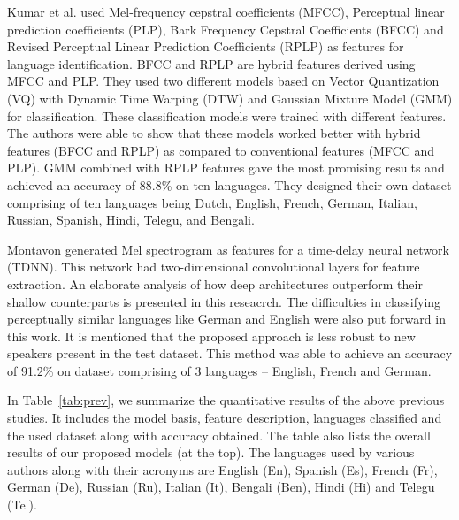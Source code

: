 \documentclass[runningheads]{llncs}
\begin{document}
Kumar et al. \cite{kumar2010spoken} used Mel-frequency cepstral coefficients (MFCC), Perceptual linear prediction coefficients (PLP), Bark Frequency Cepstral Coefficients (BFCC) and Revised Perceptual Linear Prediction Coefficients (RPLP) as features for language identification. BFCC and RPLP are hybrid features derived using MFCC and PLP. They used two different models based on Vector Quantization (VQ) with Dynamic Time Warping (DTW) and Gaussian Mixture Model (GMM) for classification. These classification models were trained with different features. The authors were able to show that these models worked better with hybrid features (BFCC and RPLP) as compared to conventional features (MFCC and PLP). GMM combined with RPLP features gave the most promising results and achieved an accuracy of 88.8\% on ten languages. They designed their own dataset comprising of ten languages being Dutch, English, French, German, Italian, Russian, Spanish, Hindi, Telegu, and Bengali. 

Montavon \cite{montavon2009deep} generated Mel spectrogram as features for a time-delay neural network (TDNN). This network had two-dimensional convolutional layers for feature extraction. An elaborate analysis of how deep architectures outperform their shallow counterparts is presented in this reseacrch. The difficulties in classifying perceptually similar languages like German and English were also put forward in this work. It is mentioned that the proposed approach is less robust to new speakers present in the test dataset. This method was able to achieve an accuracy of 91.2\% on dataset comprising of 3 languages -- English, French and German.

In Table~\ref{tab:prev}, we summarize the quantitative results of the above previous studies. It includes the model basis, feature description, languages classified and the used dataset along with accuracy obtained. The table also lists the overall results of our proposed models (at the top). The languages used by various authors along with their acronyms are English (En), Spanish (Es), French (Fr), German (De), Russian (Ru), Italian (It), Bengali (Ben), Hindi (Hi) and Telegu (Tel).
\end{document}
